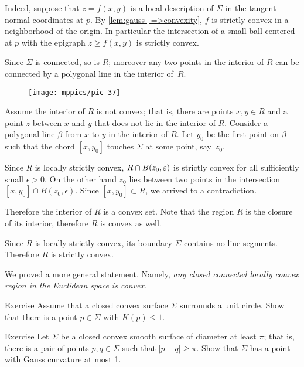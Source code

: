 Indeed, suppose that $z=f(x,y)$ is a local description of $\Sigma$ in the tangent-normal coordinates at $p$.
By \ref{lem:gauss+=>convexity}, $f$ is strictly convex in a neighborhood of the origin.
In particular the intersection of a small ball centered at $p$ with the epigraph $z\ge f(x,y)$ is strictly convex.

Since $\Sigma$ is connected, so is $R$;
moreover any two points in the interior of $R$ can be connected by a polygonal line in the interior of~$R$.

\begin{wrapfigure}{o}{43 mm}
\vskip-0mm
\centering
\texttt{[image: mppics/pic-37]}
\vskip-0mm
\end{wrapfigure}

Assume the interior of $R$ is not convex; that is, there are points $x,y\in R$ and a point $z$ between $x$ and $y$ that does not lie in the interior of $R$.
Consider a polygonal  line $\beta$ from $x$ to $y$ in the interior of $R$.
Let $y_0$ be the first point on $\beta$ such that the chord $[x,y_0]$ touches $\Sigma$ at some point, say~$z_0$.

Since $R$ is locally strictly convex, $R\z\cap B(z_0,\epsilon)$ is strictly convex for all sufficiently small $\epsilon>0$.
On the other hand $z_0$ lies between two points in the intersection $[x,y_0]\cap B(z_0,\epsilon)$.
Since $[x,y_0]\subset R$, we arrived to a contradiction.

Therefore the interior of $R$ is a convex set.
Note that the region $R$ is the closure of its interior, therefore $R$ is convex as well.

Since $R$ is locally strictly convex, its boundary $\Sigma$ contains no line segments.
Therefore $R$ is strictly convex.
\qeds

We proved a more general statement.
Namely, {}\emph{any closed connected locally convex region in the Euclidean space is convex}.

\begin{thm}{Exercise}\label{ex:surrounds-disc}
Assume that a closed convex surface $\Sigma$ surrounds a unit circle.
Show that there is a point  $p \in \Sigma$ with $K(p)\le 1$. 
\end{thm} 

\begin{thm}{Exercise}\label{ex:small-gauss}
Let $\Sigma$ be a closed convex smooth surface of diameter at least $\pi$;
that is, there is a pair of points $p,q\in\Sigma$ such that $|p-q|\ge \pi$.
Show that $\Sigma$ has a point with Gauss curvature at most 1.
\end{thm}

